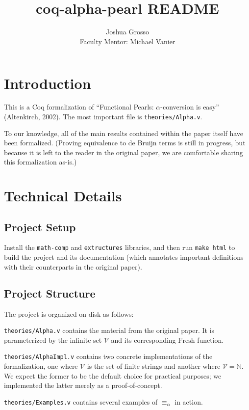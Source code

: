 \documentclass{article}
\title{coq-alpha-pearl README}
\author{Joshua Grosso \\ Faculty Mentor: Michael Vanier}
\begin{document}
\maketitle

\section{Introduction}

This is a Coq formalization of ``Functional Pearls: $\alpha$-conversion is easy'' (Altenkirch, 2002). The most important file is \verb|theories/Alpha.v|.

To our knowledge, all of the main results contained within the paper itself have been formalized. (Proving equivalence to de Bruijn terms is still in progress, but because it is left to the reader in the original paper, we are comfortable sharing this formalization as-is.)

\section{Technical Details}

\subsection{Project Setup}

Install the \verb|math-comp| and \verb|extructures| libraries, and then run \verb|make html| to
build the project and its documentation (which annotates important definitions with their
counterparts in the original paper).

\subsection{Project Structure}

The project is organized on disk as follows:

\verb|theories/Alpha.v| contains the material from the original paper. It is parameterized by the infinite set $\mathcal{V}$ and its corresponding $\textrm{Fresh}$ function.

\verb|theories/AlphaImpl.v| contains two concrete implementations of the formalization, one where
$\mathcal{V}$ is the set of finite strings and another where $\mathcal{V} = \mathbb{N}$. We expect
the former to be the default choice for practical purposes; we implemented the latter merely as a
proof-of-concept.

\verb|theories/Examples.v| contains several examples of $\equiv_\alpha$ in action.
\end{document}
